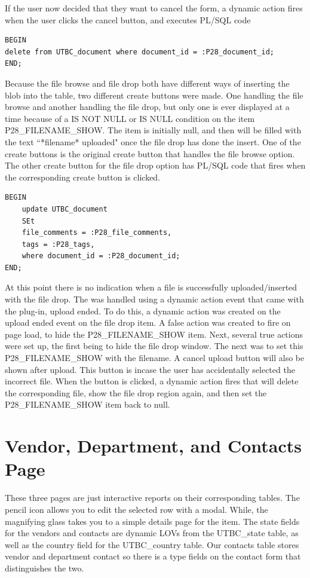 \documentclass{report}
\begin{document}
If the user now decided that they want to cancel the form, a dynamic action fires when the user clicks the cancel button, and executes PL/SQL code

\begin{lstlisting}[caption=close dialog PL/SQL]
BEGIN
delete from UTBC_document where document_id = :P28_document_id;
END;
\end{lstlisting}

Because the file browse and file drop both have different ways of inserting the blob into the table, two different create buttons were made. One handling the file browse and another handling the file drop, but only one is ever displayed at a time because of a IS NOT NULL or IS NULL condition on the item P28\_FILENAME\_SHOW. The item is initially null, and then will be filled with the text ``*filename* uploaded" once the file drop has done the insert. 
One of the create buttons is the original create button that handles the file browse option. The other create button for the file drop option has PL/SQL code that fires when the corresponding create button is clicked. 

\begin{lstlisting}[caption=update statement for filedrop]
BEGIN
	update UTBC_document
	SEt
	file_comments = :P28_file_comments, 
	tags = :P28_tags,
	where document_id = :P28_document_id;
END;
\end{lstlisting}

At this point there is no indication when a file is successfully uploaded/inserted with the file drop. The was handled using a dynamic action event that came with the plug-in, upload ended.  To do this, a dynamic action was created on the upload ended event on the file drop item. A false action was created to fire on page load, to hide the P28\_FILENAME\_SHOW item. Next, several true actions were set up, the first being to hide the file drop window. The next was to set this P28\_FILENAME\_SHOW with the filename. A cancel upload button will also be shown after upload. This button is incase the user has accidentally selected the incorrect file. When the button is clicked, a dynamic action fires that will delete the corresponding file, show the file drop region again, and then set the P28\_FILENAME\_SHOW item back to null.


\section{Vendor, Department, and Contacts Page}
These three pages are just interactive reports on their corresponding tables. The pencil icon allows you to edit the selected row with a modal. While, the magnifying glass takes you to a simple details page for the item. The state fields for the vendors and contacts are dynamic LOVs from the UTBC\_state table, as well as the country field for the UTBC\_country table. Our contacts table stores vendor and department contact so there is a type fields on the contact form that distinguishes the two.
\end{document}
